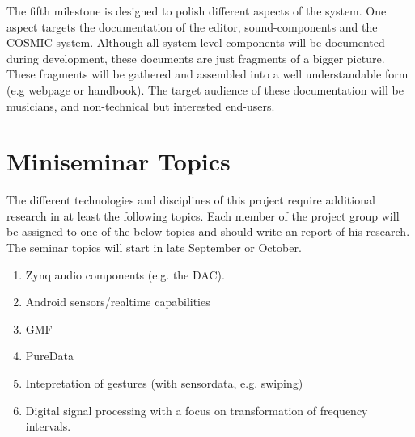 The fifth milestone is designed to polish different aspects of the system. 
One aspect targets the documentation of the editor, sound-components and the \ac{COSMIC} system. 
Although all system-level components will be documented during development, these documents are just fragments of a bigger picture. 
These fragments will be gathered and assembled into a well understandable form (e.g webpage or handbook). 
The target audience of these documentation will be musicians, and non-technical but interested end-users.  

\section{Miniseminar Topics}
The different technologies and disciplines of this project require additional research in at least the following topics.
Each member of the project group will be assigned to one of the below topics and should write an report of his research.
The seminar topics will start in late September or October.

\begin{enumerate}
	\item Zynq audio components (e.g. the DAC).
	\item Android sensors/realtime capabilities
	\item GMF
	\item PureData
	\item Intepretation of gestures (with sensordata, e.g. swiping)
	\item Digital signal processing with a focus on transformation of frequency intervals.
\end{enumerate}